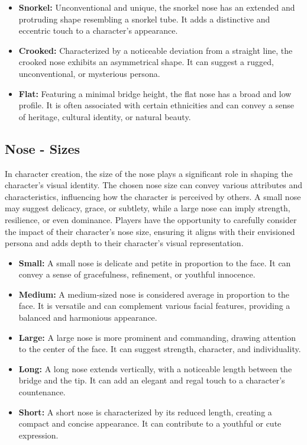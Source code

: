 \documentclass[12pt]{book}
\begin{document}
\begin{itemize}
    \item \textbf{Snorkel:} Unconventional and unique, the snorkel nose has an extended and protruding shape resembling a snorkel tube. It adds a distinctive and eccentric touch to a character's appearance.

    \item \textbf{Crooked:} Characterized by a noticeable deviation from a straight line, the crooked nose exhibits an asymmetrical shape. It can suggest a rugged, unconventional, or mysterious persona.

    \item \textbf{Flat:} Featuring a minimal bridge height, the flat nose has a broad and low profile. It is often associated with certain ethnicities and can convey a sense of heritage, cultural identity, or natural beauty.
\end{itemize}

\subsection{\textbf{Nose - Sizes}}

In character creation, the size of the nose plays a significant role in shaping the character's visual identity. The chosen nose size can convey various attributes and characteristics, influencing how the character is perceived by others. A small nose may suggest delicacy, grace, or subtlety, while a large nose can imply strength, resilience, or even dominance. Players have the opportunity to carefully consider the impact of their character's nose size, ensuring it aligns with their envisioned persona and adds depth to their character's visual representation.

\begin{itemize}
    \item \textbf{Small:} A small nose is delicate and petite in proportion to the face. It can convey a sense of gracefulness, refinement, or youthful innocence.

    \item \textbf{Medium:} A medium-sized nose is considered average in proportion to the face. It is versatile and can complement various facial features, providing a balanced and harmonious appearance.

    \item \textbf{Large:} A large nose is more prominent and commanding, drawing attention to the center of the face. It can suggest strength, character, and individuality.

    \item \textbf{Long:} A long nose extends vertically, with a noticeable length between the bridge and the tip. It can add an elegant and regal touch to a character's countenance.

    \item \textbf{Short:} A short nose is characterized by its reduced length, creating a compact and concise appearance. It can contribute to a youthful or cute expression.
\end{itemize}
\end{document}

